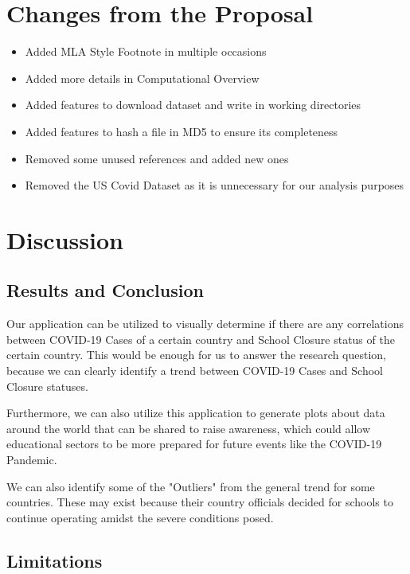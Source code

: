 \documentclass[fontsize=11pt]{article}
\begin{document}
    \section{Changes from the Proposal}

    \begin{itemize}
        \item Added MLA Style Footnote in multiple occasions
        \item Added more details in Computational Overview
        \item Added features to download dataset and write in working directories
        \item Added features to hash a file in MD5 to ensure its completeness
        \item Removed some unused references and added new ones
        \item Removed the US Covid Dataset as it is unnecessary for our analysis purposes
    \end{itemize}

    \section{Discussion}

    \subsection{Results and Conclusion}

    Our application can be utilized to visually determine if there are any correlations between COVID-19 Cases of a certain country and School Closure status of the certain country. This would be enough for us to answer the research question, because we can clearly identify a trend between COVID-19 Cases and School Closure statuses.

    Furthermore, we can also utilize this application to generate plots about data around the world that can be shared to raise awareness, which could allow educational sectors to be more prepared for future events like the COVID-19 Pandemic.

    We can also identify some of the "Outliers" from the general trend for some countries. These may exist because their country officials decided for schools to continue operating amidst the severe conditions posed.

    \subsection{Limitations}
\end{document}
